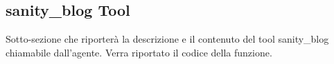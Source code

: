 \subsection{sanity\_blog Tool}

Sotto-sezione che riporterà la descrizione e il contenuto del tool sanity\_blog chiamabile dall'agente.
Verra riportato il codice della funzione.
